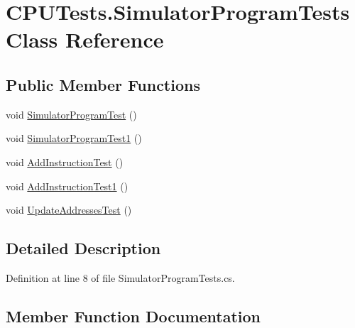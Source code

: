 \hypertarget{class_c_p_u_tests_1_1_simulator_program_tests}{}\section{C\+P\+U\+Tests.\+Simulator\+Program\+Tests Class Reference}
\label{class_c_p_u_tests_1_1_simulator_program_tests}
\subsection*{Public Member Functions}
\begin{DoxyCompactItemize}
\item 
void \hyperlink{class_c_p_u_tests_1_1_simulator_program_tests_a39f75ca090096699a4fe7fa5f2c17064}{Simulator\+Program\+Test} ()
\item 
void \hyperlink{class_c_p_u_tests_1_1_simulator_program_tests_a269c7043cbb1535664900412700019e1}{Simulator\+Program\+Test1} ()
\item 
void \hyperlink{class_c_p_u_tests_1_1_simulator_program_tests_a85d87a4e54b93797d2bcafcd58e34c3a}{Add\+Instruction\+Test} ()
\item 
void \hyperlink{class_c_p_u_tests_1_1_simulator_program_tests_a3f106fd15e2b335ce4bd08a75d541a34}{Add\+Instruction\+Test1} ()
\item 
void \hyperlink{class_c_p_u_tests_1_1_simulator_program_tests_aee1abd66255828b7f2fb5c3951c45b2b}{Update\+Addresses\+Test} ()
\end{DoxyCompactItemize}


\subsection{Detailed Description}


Definition at line 8 of file Simulator\+Program\+Tests.\+cs.



\subsection{Member Function Documentation}
\hypertarget{class_c_p_u_tests_1_1_simulator_program_tests_a85d87a4e54b93797d2bcafcd58e34c3a}{}
